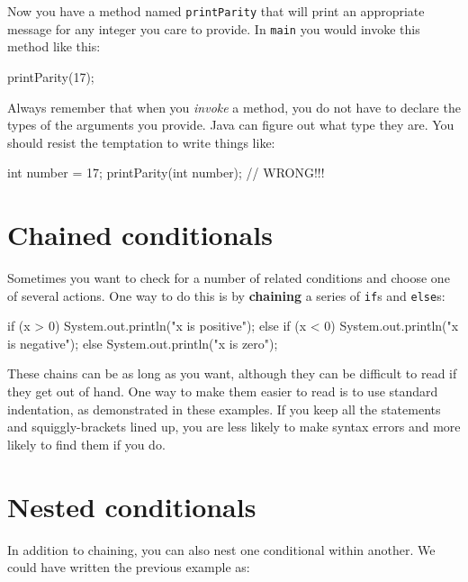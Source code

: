 %
Now you have a method named {\tt printParity} that will print
an appropriate message for any integer you care to provide.
In {\tt main} you would invoke this method like this:

\begin{code}
    printParity(17);
\end{code}
%
Always remember that when you {\em invoke} a method, you do
not have to declare the types of the arguments you provide.
Java can figure out what type they are.  You should resist the
temptation to write things like:

\begin{code}
    int number = 17;
    printParity(int number);         // WRONG!!!
\end{code}


\section {Chained conditionals}

Sometimes you want to check for a number of related conditions
and choose one of several actions.  One way to do this is by
{\bf chaining} a series of {\tt if}s and {\tt else}s:

\begin{code}
    if (x > 0) {
      System.out.println("x is positive");
    } else if (x < 0) {
      System.out.println("x is negative");
    } else {
      System.out.println("x is zero");
    }
\end{code}
%
These chains can be as long as you want, although they can
be difficult to read if they get out of hand.  One way to
make them easier to read is to use standard indentation,
as demonstrated in these examples.  If you keep all the
statements and squiggly-brackets lined up, you are less
likely to make syntax errors and more likely to find them
if you do.


\section{Nested conditionals}

In addition to chaining, you can also nest one conditional
within another.  We could have written the previous example
as:

